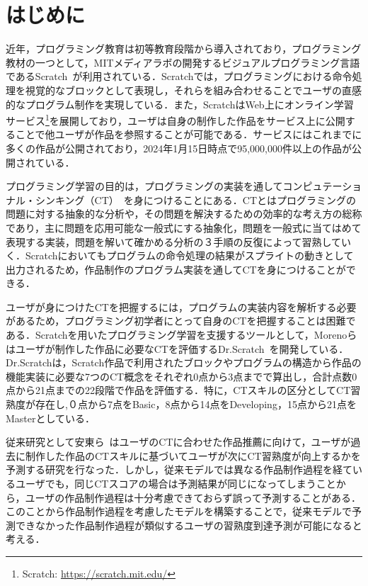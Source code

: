 \documentclass[11pt,dvipdfmx]{jreport}
\begin{document}
\chapter{はじめに}
近年，プログラミング教育は初等教育段階から導入されており，プログラミング教材の一つとして，MITメディアラボの開発するビジュアルプログラミング言語であるScratch~\cite{Resnick_2009}が利用されている．Scratchでは，プログラミングにおける命令処理を視覚的なブロックとして表現し，それらを組み合わせることでユーザの直感的なプログラム制作を実現している．また，ScratchはWeb上にオンライン学習サービス\footnote{Scratch: \url{https://scratch.mit.edu/}}を展開しており，ユーザは自身の制作した作品をサービス上に公開することで他ユーザが作品を参照することが可能である．サービスにはこれまでに多くの作品が公開されており，2024年1月15日時点で95,000,000件以上の作品が公開されている．

プログラミング学習の目的は，プログラミングの実装を通してコンピュテーショナル・シンキング（CT）~\cite{Wing_2006}を身につけることにある．CTとはプログラミングの問題に対する抽象的な分析や，その問題を解決するための効率的な考え方の総称であり，主に問題を応用可能な一般式にする抽象化，問題を一般式に当てはめて表現する実装，問題を解いて確かめる分析の３手順の反復によって習熟していく．Scratchにおいてもプログラムの命令処理の結果がスプライトの動きとして出力されるため，作品制作のプログラム実装を通してCTを身につけることができる．

ユーザが身につけたCTを把握するには，プログラムの実装内容を解析する必要があるため，プログラミング初学者にとって自身のCTを把握することは困難である．Scratchを用いたプログラミング学習を支援するツールとして，Morenoらはユーザが制作した作品に必要なCTを評価するDr.Scratch~\cite{Moreno_2015}を開発している．Dr.Scratchは，Scratch作品で利用されたブロックやプログラムの構造から作品の機能実装に必要な7つのCT概念をそれぞれ0点から3点までで算出し，合計点数0点から21点までの22段階で作品を評価する．特に，CTスキルの区分としてCT習熟度が存在し,０点から7点をBasic，8点から14点をDeveloping，15点から21点をMasterとしている．

従来研究として安東ら~\cite{Ando_2021}はユーザのCTに合わせた作品推薦に向けて，ユーザが過去に制作した作品のCTスキルに基づいてユーザが次にCT習熟度が向上するかを予測する研究を行なった．しかし，従来モデルでは異なる作品制作過程を経ているユーザでも，同じCTスコアの場合は予測結果が同じになってしまうことから，ユーザの作品制作過程は十分考慮できておらず誤って予測することがある．このことから作品制作過程を考慮したモデルを構築することで，従来モデルで予測できなかった作品制作過程が類似するユーザの習熟度到達予測が可能になると考える．
\end{document}
